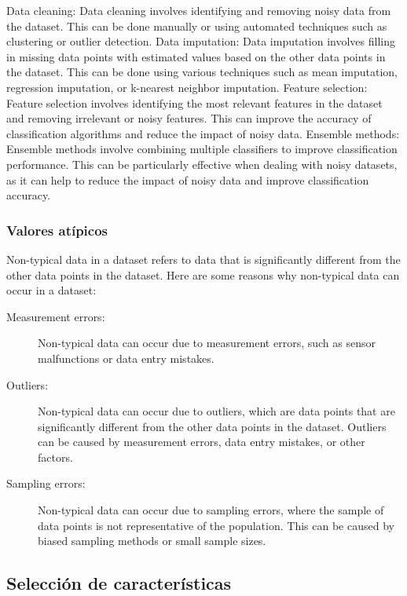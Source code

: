 \documentclass[12pt,a4paper, brazil]{article}
\begin{document}
    Data cleaning: Data cleaning involves identifying and removing noisy data from the dataset. This can be done manually or using automated techniques such as clustering or outlier detection.
    Data imputation: Data imputation involves filling in missing data points with estimated values based on the other data points in the dataset. This can be done using various techniques such as mean imputation, regression imputation, or k-nearest neighbor imputation.
    Feature selection: Feature selection involves identifying the most relevant features in the dataset and removing irrelevant or noisy features. This can improve the accuracy of classification algorithms and reduce the impact of noisy data.
    Ensemble methods: Ensemble methods involve combining multiple classifiers to improve classification performance. This can be particularly effective when dealing with noisy datasets, as it can help to reduce the impact of noisy data and improve classification accuracy.

        \subsubsection{Valores atípicos}
Non-typical data in a dataset refers to data that is significantly different from the other data points in the dataset. Here are some reasons why non-typical data can occur in a dataset:

        \begin{description}
      \item[Measurement errors:] Non-typical data can occur due to measurement errors, such as sensor malfunctions or data entry mistakes.
    
      \item[Outliers:] Non-typical data can occur due to outliers, which are data points that are significantly different from the other data points in the dataset. Outliers can be caused by measurement errors, data entry mistakes, or other factors.
    
      \item[Sampling errors:] Non-typical data can occur due to sampling errors, where the sample of data points is not representative of the population. This can be caused by biased sampling methods or small sample sizes.
    \end{description}
        
    \subsection{Selección de características}
\end{document}

